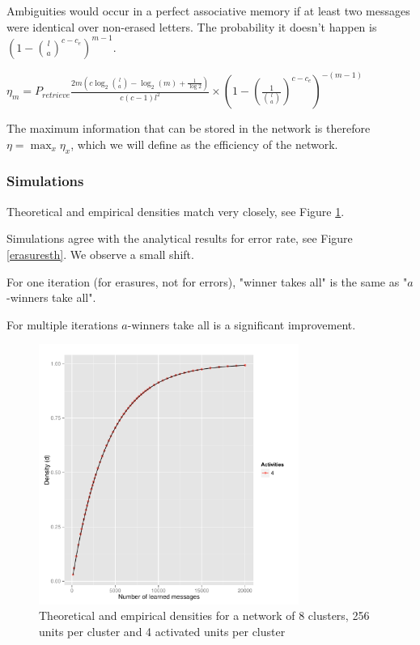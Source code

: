 \documentclass[english,10pt,twocolumn]{IEEEtran}
\theoremstyle{definition}
\begin{document}
	Ambiguities would occur in a perfect associative memory if at least two messages were identical over non-erased letters. The probability it doesn't happen is $ (1-{l \choose a}^{c - c_e})^{m-1}$.
	
	
	$\eta_m = P_{retrieve}  \frac{2 m\left(c \log_2{l \choose a } - \log_2(m) + \frac{1}{\log 2} \right)}{c(c-1)l^2} \times (1-(\frac{1}{{l \choose a}})^{c - c_e})^{-(m-1)}$
	
	The maximum information that can be stored in the network is therefore $\eta = \max_x \eta_x $, which we will define as the efficiency of the network.
	
	\subsubsection{Simulations}
		Theoretical and empirical densities match very closely, see Figure \ref{densiteth}. %
		
		
		
		Simulations agree with the analytical results for error rate, see Figure \ref{erasuresth}. We observe a small shift.
	

	For one iteration (for erasures, not for errors), "winner takes all" is the same as "$a$-winners take all".
	
	For multiple iterations $a$-winners take all is a significant improvement.
	
	
		
	\begin{figure}[!htb]
		\includegraphics[width=8.5cm]{Courbes/remplacement_densite_c8l256a4}
		\caption{Theoretical and empirical densities for a network of 8 clusters, 256 units per cluster and 4 activated units per cluster}
			\label{densiteth}
	\end{figure}
	
\end{document}
